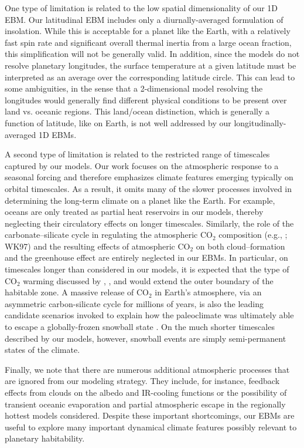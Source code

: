One type of limitation is related to the low spatial dimensionality of
our 1D EBM.  Our latitudinal EBM includes only a diurnally-averaged
formulation of insolation. While this is acceptable for a planet like
the Earth, with a relatively fast spin rate and significant overall
thermal inertia from a large ocean fraction, this simplification will
not be generally valid. In addition, since the models do not resolve
planetary longitudes, the surface temperature at a given latitude must
be interpreted as an average over the corresponding latitude
circle. This can lead to some ambiguities, in the sense that a
2-dimensional model resolving the longitudes would generally find
different physical conditions to be present over land vs. oceanic
regions. This land/ocean distinction, which is generally a function of
latitude, like on Earth, is not well addressed by our
longitudinally-averaged 1D EBMs.

A second type of limitation is related to the restricted range of
timescales captured by our models. Our work focuses on the atmospheric
response to a seasonal forcing and therefore emphasizes climate
features emerging typically on orbital timescales. As a result, it
omits many of the slower processes involved in determining the
long-term climate on a planet like the Earth. For example, oceans are
only treated as partial heat reservoirs in our models, thereby
neglecting their circulatory effects on longer timescales. Similarly,
the role of the carbonate--silicate cycle in regulating the
atmospheric CO$_2$ composition (e.g., \citealt{kasting_et_al1993};
WK97) and the resulting effects of atmospheric CO$_2$ on both
cloud--formation and the greenhouse effect are entirely neglected in
our EBMs.  In particular, on timescales longer than considered in our
models, it is expected that the type of CO$_2$ warming discussed by
\citet{kasting_et_al1993}, \citet{forget+pierrehumbert1997}, and
\citet{mischna_et_al2000} would extend the outer boundary of the
habitable zone.  A massive release of CO$_2$ in Earth's atmosphere,
via an asymmetric carbon-silicate cycle for millions of years, is also
the leading candidate scenarios invoked to explain how the
paleoclimate was ultimately able to escape a globally-frozen snowball
state \citep{hoffman+schrag2002}. On the much shorter timescales
described by our models, however, snowball events are simply
semi-permanent states of the climate.

Finally, we note that there are numerous additional atmospheric
processes that are ignored from our modeling strategy. They include,
for instance, feedback effects from clouds on the albedo and
IR-cooling functions or the possibility of transient oceanic
evaporation and partial atmospheric escape in the regionally hottest
models considered. Despite these important shortcomings, our EBMs are
useful to explore many important dynamical climate features possibly
relevant to planetary habitability.


